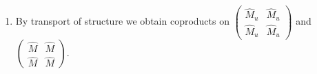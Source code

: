 \documentclass[reqno]{amsart}
\numberwithin{equation}{section}
\newcommand{\C}{\mathbb{C}}
\newcommand{\red}{\mathrm{red}}
\newcommand{\Mult}{\operatorname{M}}
\begin{document}
\begin{enumerate}
\begin{equation}
\end{equation}
which is non-degenerate when interpreted as a a map into $ \Mult(M_2(\C) \otimes \mathcal{K}(L^2(M)))$. Under the isomorphism \eqref{EqTrivialisationCstar}, the element $\begin{pmatrix} 0 & 1_{\hat{M}_u}\\ 0 & 0 \end{pmatrix}$ can be seen as living in $ \Mult(\hat{Q}_u)$, and we can define an element
\[
u = \hat{\pi}_{\red,12}(1_{\hat{M}_u}) \in \hat{M}_{12}
\]
which satisfies
\[
u^*u = 1_{\hat{M}},\qquad uu^* = 1_{\hat{P}}. 
\]
Using this element, we obtain an isomorphism 
\[
\begin{pmatrix} \hat{M}_{11}& \hat{M}_{12}\\ \hat{M}_{21}&\hat{M}_{22}\end{pmatrix}\ni \begin{pmatrix}
a & b \\ 
c & d
\end{pmatrix}\mapsto 
\begin{pmatrix}
u^* a u & u^*b \\
 c u& d
\end{pmatrix}
\in 
\begin{pmatrix} \hat{M}& \hat{M}\\ \hat{M}&\hat{M}\end{pmatrix}.
\] 
Composing with this isomorphism, the map \eqref{eq8} trivializes to 
\[
\begin{pmatrix} \hat{\pi}_{\red} & \hat{\pi}_{\red} \\ \hat{\pi}_{\red} & \hat{\pi}_{\red}\end{pmatrix}\colon \begin{pmatrix} \hat{M}_u& \hat{M}_u\\ \hat{M}_u&\hat{M}_u\end{pmatrix} \rightarrow \begin{pmatrix} \hat{M}& \hat{M}\\ \hat{M}&\hat{M}\end{pmatrix}.
\]
\item By transport of structure we obtain coproducts on $\begin{pmatrix} \hat{M}_u& \hat{M}_u\\ \hat{M}_u&\hat{M}_u\end{pmatrix}$ and $\begin{pmatrix} \hat{M}& \hat{M}\\ \hat{M}&\hat{M}\end{pmatrix}$.
\end{enumerate}
\end{document}
